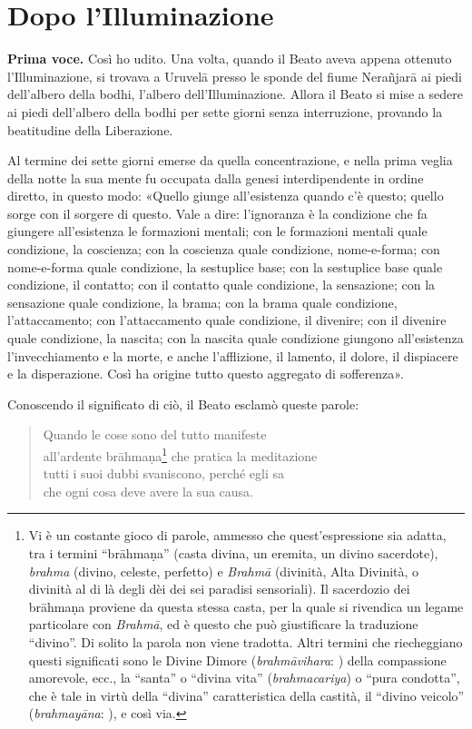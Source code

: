 \chapter{Dopo l’Illuminazione}

\textbf{Prima voce.} Così ho udito. Una volta, quando il Beato aveva appena
ottenuto l’Illuminazione, si trovava a Uruvelā presso le sponde del
fiume Nerañjarā ai piedi dell’albero della bodhi, l’albero
dell’Illuminazione. Allora il Beato si mise a sedere ai piedi
dell’albero della bodhi per sette giorni senza interruzione, provando la
beatitudine della Liberazione.


Al termine dei sette giorni emerse da quella concentrazione, e nella
prima veglia della notte la sua mente fu occupata dalla genesi
interdipendente in ordine diretto, in questo modo: «Quello giunge
all’esistenza quando c’è questo; quello sorge con il sorgere di questo.
Vale a dire: l’ignoranza è la condizione che fa giungere all’esistenza
le formazioni mentali; con le formazioni mentali quale condizione, la
coscienza; con la coscienza quale condizione, nome-e-forma; con
nome-e-forma quale condizione, la sestuplice base; con la sestuplice
base quale condizione, il contatto; con il contatto quale condizione, la
sensazione; con la sensazione quale condizione, la brama; con la brama
quale condizione, l’attaccamento; con l’attaccamento quale condizione,
il divenire; con il divenire quale condizione, la nascita; con la
nascita quale condizione giungono all’esistenza l’invecchiamento e la
morte, e anche l’afflizione, il lamento, il dolore, il dispiacere e la
disperazione. Così ha origine tutto questo aggregato di sofferenza».


Conoscendo il significato di ciò, il Beato esclamò queste parole:


\begin{quotation}
Quando le cose sono del tutto manifeste \\
all’ardente brāhmaṇa\footnote{Vi è un costante gioco di parole, ammesso che quest’espressione sia adatta, tra i termini “brāhmaṇa” (casta divina, un eremita, un divino sacerdote), \emph{brahma} (divino, celeste, perfetto) e \emph{Brahmā} (divinità, Alta Divinità, o divinità al di là degli dèi dei sei paradisi sensoriali). Il sacerdozio dei brāhmaṇa proviene da questa stessa casta, per la quale si rivendica un legame particolare con \emph{Brahmā}, ed è questo che può giustificare la traduzione “divino”. Di solito la parola non viene tradotta. Altri termini che riecheggiano questi significati sono le Divine Dimore (\emph{brahmāvihara}: \hyperlink{cap-10-Il-periodo-di-mezzo#pag200}{}) della compassione amorevole, ecc., la “santa” o “divina vita” (\emph{brahmacariya}) o “pura condotta”, che è tale in virtù della “divina” caratteristica della castità, il “divino veicolo” (\emph{brahmayāna}: \hyperlink{cap-12-La-Dottrina#pag281}{}), e così via.} che pratica la meditazione \\
tutti i suoi dubbi svaniscono, perché egli sa \\
che ogni cosa deve avere la sua causa.
\end{quotation}

